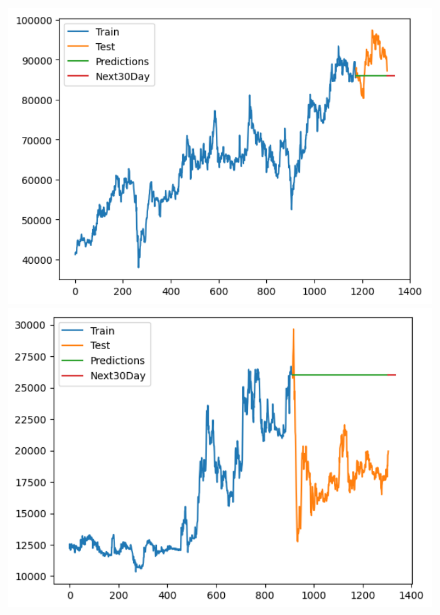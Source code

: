 \begin{figure}[H]
\begin{minipage}{0.15\textwidth}
    \end{minipage}
    \hfill
        \begin{minipage}{0.15\textwidth}
    \centering
    \includegraphics[width=1\textwidth]{resources/chapter-5/newdata/result/VCB_ARIMA_9-1.png}
    \end{minipage}
    \hfill
    \begin{minipage}{0.15\textwidth}
    \centering
    \includegraphics[width=1\textwidth]{resources/chapter-5/newdata/result/EIB_ARIMA_7-3.png}
    \end{minipage}
    \hfill
    \begin{minipage}{0.15\textwidth}
    \centering

\end{minipage}
\end{figure}
